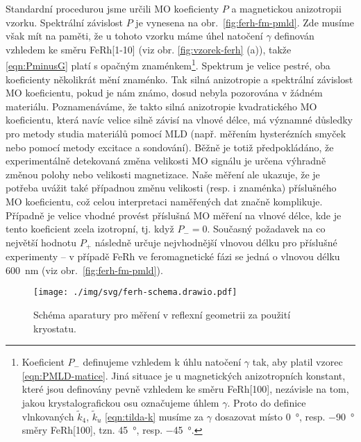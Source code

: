 Standardní procedurou jsme určili MO koeficienty $P$ a magnetickou anizotropii vzorku.
Spektrální závislost $P$ je vynesena na obr.~\ref{fig:ferh-fm-pmld}.
Zde musíme však mít na paměti, že u tohoto vzorku máme úhel natočení $\gamma$ definován vzhledem ke směru FeRh[1-10] (viz obr. \ref{fig:vzorek-ferh} (a)), takže \eqref{eqn:PminusG} platí s opačným znaménkem\footnote{Koeficient $P_-$ definujeme vzhledem k úhlu natočení $\gamma$ tak, aby platil vzorec \eqref{eqn:PMLD-matice}. Jiná situace je u magnetických anizotropních konstant, které jsou definovány pevně vzhledem ke směru FeRh[100], nezávisle na tom, jakou krystalografickou osu označujeme úhlem $\gamma$. Proto do definice vlnkovaných $\tilde{k}_4$, $\tilde{k}_u$ \eqref{eqn:tilda-k} musíme za $\gamma$ dosazovat místo \SI{0}{\degree}, resp. \SI{-90}{\degree} směry FeRh[100], tzn. \SI{45}{\degree}, resp. \SI{-45}{\degree}.}.
Spektrum je velice pestré, oba koeficienty několikrát mění znaménko.
Tak silná anizotropie a spektrální závislost MO koeficientu, pokud je nám známo\cite{hamrleHugeQuadraticMagnetooptical2007,liangQuantitativeStudyQuadratic2015,silberQuadraticMagnetoopticKerr2019}, dosud nebyla pozorována v žádném materiálu.
Poznamenáváme, že takto silná anizotropie kvadratického MO koeficientu, která navíc velice silně závisí na vlnové délce, má významné důsledky pro metody studia materiálů pomocí MLD (např. měřením hysterézních smyček\cite{tesarovaSystematicStudyMagnetic2014} nebo pomocí metody excitace a sondování\cite{saidlOpticalDeterminationNeel2017}).
Běžně je totiž předpokládáno, že experimentálně detekovaná změna velikosti MO signálu je určena výhradně změnou polohy\cite{tesarovaSystematicStudyMagnetic2014} nebo velikosti\cite{saidlOpticalDeterminationNeel2017} magnetizace.
Naše měření ale ukazuje, že je potřeba uvážit také případnou změnu velikosti (resp. i znaménka) příslušného MO koeficientu, což celou interpretaci naměřených dat značně komplikuje.
Případně je velice vhodné provést příslušná MO měření na vlnové délce, kde je tento koeficient zcela izotropní, tj. když $P_-=0$.
Současný požadavek na co největší hodnotu $P_+$ následně určuje nejvhodnější vlnovou délku pro příslušné experimenty -- v případě FeRh ve feromagnetické fázi se jedná o vlnovou délku \SI{600}{\nano\meter} (viz obr.~\ref{fig:ferh-fm-pmld}).

\begin{figure}[htbp]
    \centering
    \texttt{[image: ./img/svg/ferh-schema.drawio.pdf]}
    \caption{Schéma aparatury pro měření v reflexní geometrii za použití kryostatu.}
    \label{fig:ferh-schema}
\end{figure}

